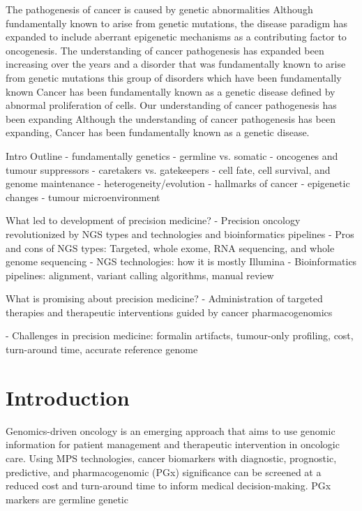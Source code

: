 The pathogenesis of cancer is caused by genetic abnormalities
Although fundamentally known to arise from genetic mutations, the disease paradigm has expanded to include aberrant epigenetic mechanisms as a contributing factor to oncogenesis.
The understanding of cancer pathogenesis has expanded been increasing over the years and a disorder that was fundamentally known to arise from genetic mutations this group of disorders which have been fundamentally known Cancer has been fundamentally known as a genetic disease defined by abnormal proliferation of cells.
Our understanding of cancer pathogenesis has been expanding  Although the understanding of cancer pathogenesis has been expanding, Cancer has been fundamentally known as a genetic disease.

Intro Outline
- fundamentally genetics
- germline vs. somatic
- oncogenes and tumour suppressors
- caretakers vs. gatekeepers
- cell fate, cell survival, and genome maintenance
- heterogeneity/evolution
- hallmarks of cancer
- epigenetic changes
- tumour microenvironment

What led to development of precision medicine?
- Precision oncology revolutionized by NGS types and technologies and bioinformatics pipelines
- Pros and cons of NGS types: Targeted, whole exome, RNA sequencing, and whole genome sequencing
- NGS technologies: how it is mostly Illumina
- Bioinformatics pipelines: alignment, variant calling algorithms, manual review

What is promising about precision medicine?
- Administration of targeted therapies and therapeutic interventions guided by cancer pharmacogenomics

- Challenges in precision medicine: formalin artifacts, tumour-only profiling, cost, turn-around time, accurate reference genome

\section{Introduction}
\label{sec:Introduction}

Genomics-driven oncology is an emerging approach that aims to use genomic information for patient management and therapeutic intervention in oncologic care. Using MPS technologies, cancer biomarkers with diagnostic, prognostic, predictive, and pharmacogenomic (PGx) significance can be screened at a reduced cost and turn-around time to inform medical decision-making. PGx markers are germline genetic

